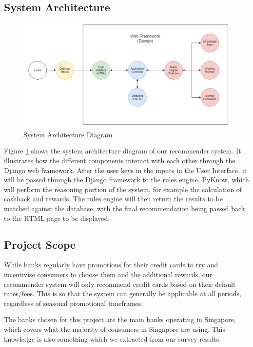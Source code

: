 
\subsection{System Architecture} %
\label{sub:system_architecture}
	\begin{figure}[h]
		\centering
		\includegraphics[width=\linewidth]{img/SystemArchitectureDiagram1a.jpg}
		\caption{System Architecture Diagram}
		\label{fig:system_architecture_diagram}
	\end{figure}
	Figure \ref{fig:system_architecture_diagram} shows the system architecture diagram of our recommender system. It illustrates how the different components interact with each other through the Django web framework. After the user keys in the inputs in the User Interface, it will be passed through the Django framework to the rules engine, PyKnow, which will perform the reasoning portion of the system, for example the calculation of cashback and rewards. The rules engine will then return the results to be matched against the database, with the final recommendation being passed back to the HTML page to be displayed.


\subsection{Project Scope} %
\label{sub:project_scope}
While banks regularly have promotions for their credit cards to try and incentivise consumers to choose them and the additional rewards, our recommender system will only recommend credit cards based on their default rates/fees. This is so that the system can generally be applicable at all periods, regardless of seasonal promotional timeframes.

The banks chosen for this project are the main banks operating in Singapore, which covers what the majority of consumers in Singapore are using. This knowledge is also something which we extracted from our survey results.

